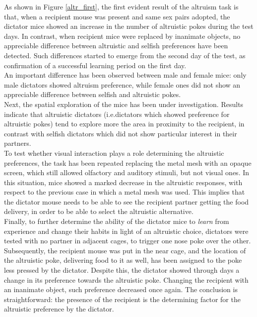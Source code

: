 \documentclass[12pt, a4paper]{report}
\begin{document}
As shown in Figure \ref{altr_first}, the first evident result of the altruism task is that, when a recipient mouse was present and same sex pairs adopted, the dictator mice showed an increase in the number of altruistic pokes during the test days. In contrast, when recipient mice were replaced by inanimate objects, no appreciable difference between altruistic and selfish preferences have been detected. Such differences started to emerge from the second day of the test, as confirmation of a successful learning period on the first day. \\
An important difference has been observed between male and female mice:  only male dictators showed altruism preference, while female ones did not show an appreciable difference between selfish and altruistic pokes.\\
Next, the spatial exploration of the mice has been under investigation. Results indicate that altruistic dictators (i.e.dictators which showed preference for altruistic pokes) tend to explore more the area in proximity to the recipient, in contrast with selfish dictators which did not show particular interest in their partners.\\
To test whether visual interaction plays a role determining the altruistic preferences, the task has been repeated replacing the metal mesh with an opaque screen, which still allowed olfactory and auditory stimuli, but not visual ones. In this situation, mice showed a marked decrease in the altruistic responses, with respect to the previous case in which a metal mesh was used. This implies that the dictator mouse needs to be able to see the recipient partner getting the food delivery, in order to be able to select the altruistic alternative.\\
Finally, to further determine the ability of the dictator mice to \textit{learn} from experience and change their habits in light of an altruistic choice, dictators were tested with no partner in adjacent cages, to trigger one nose poke over the other. Subsequently, the recipient mouse was put in the near cage, and the location of the altruistic poke, delivering food to it as well, has been assigned to the poke less pressed by the dictator. Despite this, the dictator showed through days a change in its preference towards the altruistic poke. Changing the recipient with an inanimate object, such preference decreased once again. The conclusion is straightforward: the presence of the recipient is the determining factor for the altruistic preference by the dictator.
\\
\end{document}
